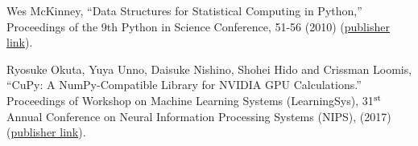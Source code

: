 \documentclass{webofc}
\begin{document}
\begin{thebibliography}{8}
 Wes McKinney, ``Data Structures for Statistical Computing in Python,'' Proceedings of the 9th Python in Science Conference, 51-56 (2010) (\textcolor{blue}{\href{http://conference.scipy.org/proceedings/scipy2010/mckinney.html}{publisher link}}).

 Ryosuke Okuta, Yuya Unno, Daisuke Nishino, Shohei Hido and Crissman Loomis, ``CuPy: A NumPy-Compatible Library for NVIDIA GPU Calculations.'' Proceedings of Workshop on Machine Learning Systems (LearningSys), 31$^{\mbox{\scriptsize st}}$ Annual Conference on Neural Information Processing Systems (NIPS), (2017) (\textcolor{blue}{\href{http://learningsys.org/nips17/assets/papers/paper_16.pdf}{publisher link}}).

\end{thebibliography}
\end{document}
